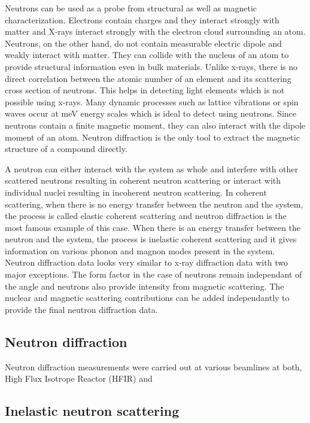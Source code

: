 \documentclass[10pt,doublespacing,edeposit]{uiucthesis2020}
\begin{document}
\begin{mainmatter}
Neutrons can be used as a probe from structural as well as magnetic characterization. Electrons contain charges and they interact strongly with matter and X-rays interact strongly with the electron cloud surrounding an atom. Neutrons, on the other hand, do not contain measurable electric dipole and weakly interact with matter. They can collide with the nucleus of an atom to provide structural information even in bulk materials. Unlike x-rays, there is no direct correlation between the atomic number of an element and its scattering cross section of neutrons. This helps in detecting light elements which is not possible using x-rays. Many dynamic processes such as lattice vibrations or spin waves occur at meV energy scales which is ideal to detect using neutrons. Since neutrons contain a finite magnetic moment, they can also interact with the dipole moment of an atom. Neutron diffraction is the only tool to extract the magnetic structure of a compound directly.

A neutron can either interact with the system as whole and interfere with other scattered neutrons resulting in coherent neutron scattering or interact with individual nuclei resulting in incoherent neutron scattering. In coherent scattering, when there is no energy transfer between the neutron and the system, the process is called elastic coherent scattering and neutron diffraction is the most famous example of this case. When there is an energy transfer between the neutron and the system, the process is inelastic coherent scattering and it gives information on various phonon and magnon modes present in the system. Neutron diffraction data looks very similar to x-ray diffraction data with two major exceptions. The form factor in the case of neutrons remain independant of the angle and neutrons also provide intensity from magnetic scattering. The nuclear and magnetic scattering contributions can be added independantly to provide the final neutron diffraction data.

\subsection{Neutron diffraction}


Neutron diffraction measurements were carried out at various beamlines at both, High Flux Isotrope Reactor (HFIR) and 

\subsection{Inelastic neutron scattering}


\end{mainmatter}
\end{document}
